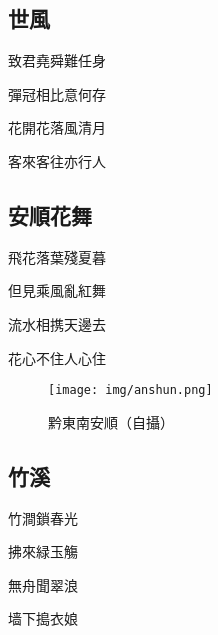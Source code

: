 \documentclass[a4j,12pt]{ltjtarticle}
\begin{document}
\begin{center}
	\begin{flushleft}
		\section{世風} 
	\end{flushleft}
	
	\vfill
	\LARGE 	致君堯舜難任身\par
	彈冠相比意何存 \par
	花開花落風清月 \par
	客來客往亦行人 \par
	\vspace{1.5cm} %
	\vfill
	
	\newpage
	
	\begin{flushleft}
		\section{安順花舞} 
	\end{flushleft}	
	
	
	\vfill
	\LARGE 	飛花落葉殘夏暮\par
	但見乘風亂紅舞 \par
	流水相携天邊去 \par
	花心不住人心住 
	\vfill
	
	
	\newpage
	\vspace{3cm}
	\vfill
	\begin{figure}[h!]
		\centering
		\texttt{[image: img/anshun.png]}
		\caption{黔東南安順（自攝）}
		\label{fig:zhenwu}
	\end{figure}
	\vfill
	
	\newpage
	
	\begin{flushleft}
		\section{竹溪} 
	\end{flushleft}	
	
	\vfill
	\LARGE 	竹澗鎖春光\par
	拂來緑玉觴 \par
	無舟聞翠浪 \par
	墙下搗衣娘 \par
	\vfill
	

\end{center}
\end{document}

